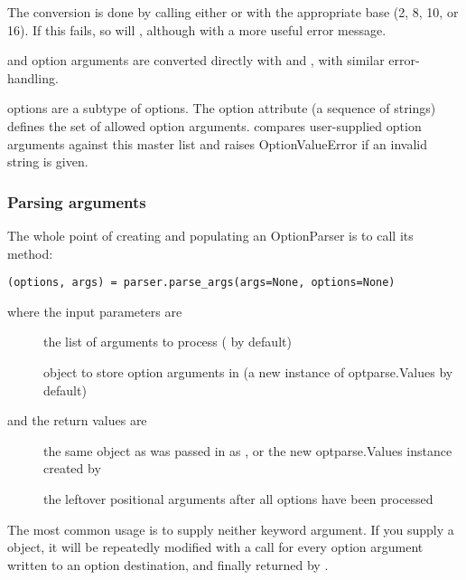 The conversion is done by calling either  or  with
the appropriate base (2, 8, 10, or 16).  If this fails, so will ,
although with a more useful error message.

 and  option arguments are converted directly with
 and , with similar error-handling.

 options are a subtype of  options.  The 
option attribute (a sequence of strings) defines the set of allowed
option arguments.   compares
user-supplied option arguments against this master list and raises
OptionValueError if an invalid string is given.


\subsubsection{Parsing arguments\label{optparse-parsing-arguments}}

The whole point of creating and populating an OptionParser is to call
its  method:
\begin{verbatim}
(options, args) = parser.parse_args(args=None, options=None)
\end{verbatim}

where the input parameters are
\begin{description}
\item[]
the list of arguments to process ( by default)
\item[]
object to store option arguments in (a new instance of
optparse.Values by default)
\end{description}

and the return values are
\begin{description}
\item[]
the same object as was passed in as , or the new
optparse.Values instance created by 
\item[]
the leftover positional arguments after all options have been
processed
\end{description}

The most common usage is to supply neither keyword argument.  If you
supply a  object, it will be repeatedly modified with a
 call for every option argument written to an option
destination, and finally returned by .

